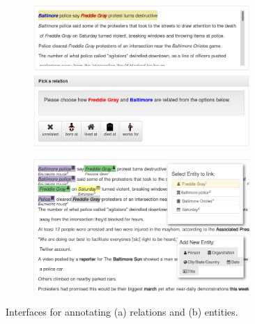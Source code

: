 \begin{figure}[!th]
  \centering
  \begin{subfigure}{\textwidth}
  \centering
    \includegraphics[width=0.9\textwidth]{figures/interface/relation-interface}
    \caption{\label{fig:relation-interface}}
  \end{subfigure}

  \begin{subfigure}{\textwidth}
  \centering
    \includegraphics[width=0.9\textwidth]{figures/interface/extraction-interface}
    \caption{\label{fig:entity-interface}}
  \end{subfigure}

  \caption[Annotation interfaces for KBP]{\label{fig:interfaces}
  Interfaces for annotating (a) relations and (b) entities.
  }
\end{figure}


